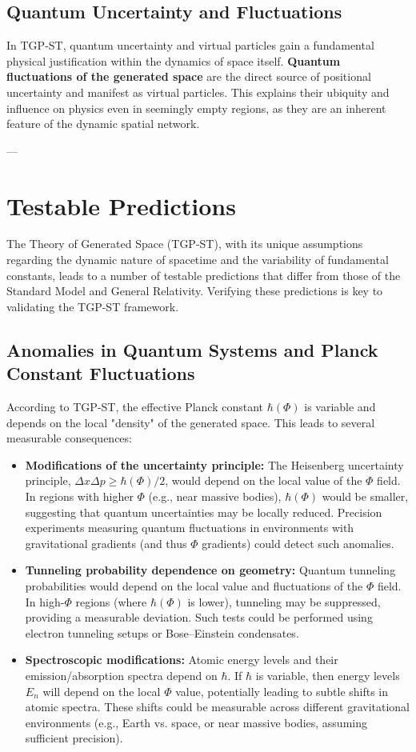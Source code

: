 \documentclass[11pt,a4paper]{article}
\begin{document}
\subsection{Quantum Uncertainty and Fluctuations}
In TGP-ST, quantum uncertainty and virtual particles gain a fundamental physical justification within the dynamics of space itself. \textbf{Quantum fluctuations of the generated space} are the direct source of positional uncertainty and manifest as virtual particles. This explains their ubiquity and influence on physics even in seemingly empty regions, as they are an inherent feature of the dynamic spatial network.

---

\section{Testable Predictions}
\label{sec:Testy}

The Theory of Generated Space (TGP-ST), with its unique assumptions regarding the dynamic nature of spacetime and the variability of fundamental constants, leads to a number of testable predictions that differ from those of the Standard Model and General Relativity. Verifying these predictions is key to validating the TGP-ST framework.

\subsection{Anomalies in Quantum Systems and Planck Constant Fluctuations}
According to TGP-ST, the effective Planck constant $\hbar(\Phi)$ is variable and depends on the local "density" of the generated space. This leads to several measurable consequences:
\begin{itemize}
    \item \textbf{Modifications of the uncertainty principle:} The Heisenberg uncertainty principle, $\Delta x \Delta p \ge \hbar(\Phi)/2$, would depend on the local value of the $\Phi$ field. In regions with higher $\Phi$ (e.g., near massive bodies), $\hbar(\Phi)$ would be smaller, suggesting that quantum uncertainties may be locally reduced. Precision experiments measuring quantum fluctuations in environments with gravitational gradients (and thus $\Phi$ gradients) could detect such anomalies.
    \item \textbf{Tunneling probability dependence on geometry:} Quantum tunneling probabilities would depend on the local value and fluctuations of the $\Phi$ field. In high-$\Phi$ regions (where $\hbar(\Phi)$ is lower), tunneling may be suppressed, providing a measurable deviation. Such tests could be performed using electron tunneling setups or Bose–Einstein condensates.
    \item \textbf{Spectroscopic modifications:} Atomic energy levels and their emission/absorption spectra depend on $\hbar$. If $\hbar$ is variable, then energy levels $E_n$ will depend on the local $\Phi$ value, potentially leading to subtle shifts in atomic spectra. These shifts could be measurable across different gravitational environments (e.g., Earth vs. space, or near massive bodies, assuming sufficient precision).
\end{itemize}
\end{document}
